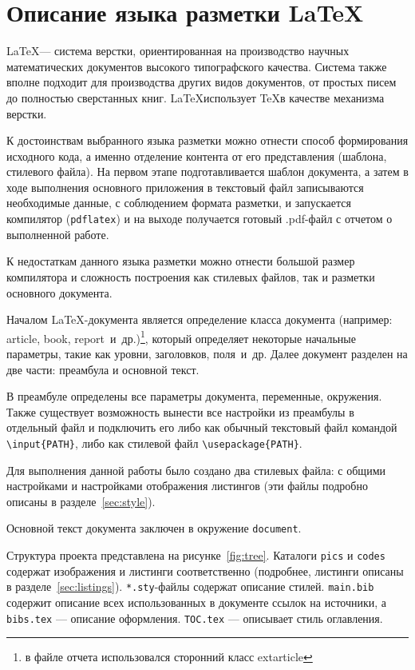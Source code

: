 \section{Описание языка разметки \LaTeX}
\label{sec:latex}
\LaTeX --- система верстки, ориентированная на производство научных математических документов высокого типографского качества. Система также вполне подходит для производства других видов документов, от простых писем до полностью сверстанных книг. \LaTeX использует \TeX в качестве механизма верстки.~\cite{lshort}

К достоинствам выбранного языка разметки можно отнести способ формирования исходного кода, а именно отделение контента от его представления (шаблона, стилевого файла). На первом этапе подготавливается шаблон документа, а затем в ходе выполнения основного приложения в текстовый файл записываются необходимые данные, с соблюдением формата разметки, и запускается компилятор (\texttt{pdflatex}) и на выходе получается готовый .pdf-файл с отчетом о выполненной работе.

К недостаткам данного языка разметки можно отнести большой размер компилятора и сложность построения как стилевых файлов, так и разметки основного документа.

Началом \LaTeX-документа является определение класса документа (например: article, book, report~и~др.)\footnote{в файле отчета использовался сторонний класс extarticle}, который определяет некоторые начальные параметры, такие как уровни, заголовков, поля~и~др. Далее документ разделен на две части: преамбула и основной текст.

В преамбуле определены все параметры документа, переменные, окружения. Также существует возможность вынести все настройки из преамбулы в отдельный файл и подключить его либо как обычный текстовый файл командой \texttt{\textbackslash input\{PATH\}}, либо как стилевой файл \texttt{\textbackslash usepackage\{PATH\}}.

Для выполнения данной работы было создано два стилевых файла: с общими настройками и настройками отображения листингов (эти файлы подробно описаны в разделе~\ref{sec:style}).

Основной текст документа заключен в окружение \texttt{document}.

Структура проекта представлена на рисунке~\ref{fig:tree}. Каталоги \texttt{pics} и \texttt{codes} содержат изображения и листинги соответственно (подробнее, листинги описаны в разделе~\ref{sec:listings}). \texttt{*.sty}-файлы содержат описание стилей. \texttt{main.bib} содержит описание всех использованных в документе ссылок на источники, а \texttt{bibs.tex} --- описание оформления. \texttt{TOC.tex} --- описывает стиль оглавления.

